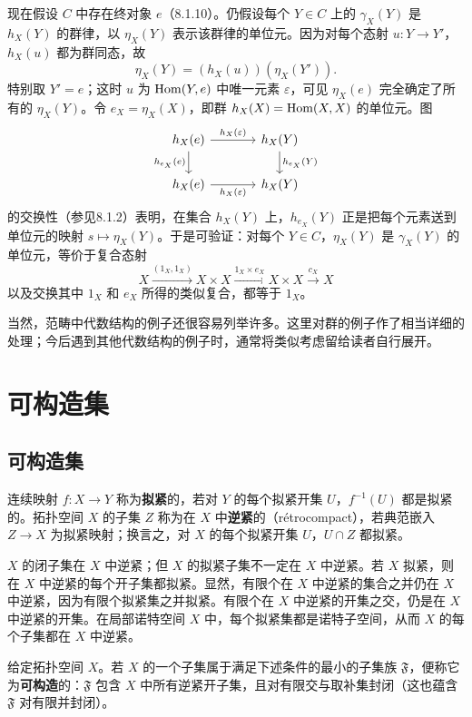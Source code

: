 现在假设 $C$ 中存在终对象 $e$（8.1.10）。仍假设每个 $Y\in C$ 上的 $\gamma_X(Y)$ 是 $h_X(Y)$ 的群律，以 $\eta_X(Y)$ 表示该群律的单位元。因为对每个态射 $u:Y\to Y'$，$h_X(u)$ 都为群同态，故
\[
\eta_X(Y)=(h_X(u))(\eta_X(Y')).
\]
特别取 $Y'=e$；这时 $u$ 为 $\operatorname{Hom}(Y,e)$ 中唯一元素 $\varepsilon$，可见 $\eta_X(e)$ 完全确定了所有的 $\eta_X(Y)$。令 $e_X=\eta_X(X)$，即群 $h_X(X)=\operatorname{Hom}(X,X)$ 的单位元。图
\[
\begin{tikzcd}[column sep=large]
h_X(e)\arrow[r,"h_X(\varepsilon)"]\arrow[d,"h_{e_X}(e)"']&h_X(Y)\arrow[d,"h_{e_X}(Y)"]\\
h_X(e)\arrow[r,"h_X(\varepsilon)"']&h_X(Y)
\end{tikzcd}
\]
的交换性（参见8.1.2）表明，在集合 $h_X(Y)$ 上，$h_{e_X}(Y)$ 正是把每个元素送到单位元的映射 $s\mapsto\eta_X(Y)$。于是可验证：对每个 $Y\in C$，$\eta_X(Y)$ 是 $\gamma_X(Y)$ 的单位元，等价于复合态射
\[
X\xrightarrow{(1_X,1_X)}X\times X
\xrightarrow{1_X\times e_X}X\times X\xrightarrow{c_X}X
\]
以及交换其中 $1_X$ 和 $e_X$ 所得的类似复合，都等于 $1_X$。

当然，范畴中代数结构的例子还很容易列举许多。这里对群的例子作了相当详细的处理；今后遇到其他代数结构的例子时，通常将类似考虑留给读者自行展开。\par

\section{可构造集}
\subsection{可构造集}
连续映射 $f:X\to Y$ 称为\textbf{拟紧}的，若对 $Y$ 的每个拟紧开集 $U$，$f^{-1}(U)$ 都是拟紧的。拓扑空间 $X$ 的子集 $Z$ 称为在 $X$ 中\textbf{逆紧}的（rétrocompact），若典范嵌入 $Z\to X$ 为拟紧映射；换言之，对 $X$ 的每个拟紧开集 $U$，$U\cap Z$ 都拟紧。

$X$ 的闭子集在 $X$ 中逆紧；但 $X$ 的拟紧子集不一定在 $X$ 中逆紧。若 $X$ 拟紧，则在 $X$ 中逆紧的每个开子集都拟紧。显然，有限个在 $X$ 中逆紧的集合之并仍在 $X$ 中逆紧，因为有限个拟紧集之并拟紧。有限个在 $X$ 中逆紧的开集之交，仍是在 $X$ 中逆紧的开集。在局部诺特空间 $X$ 中，每个拟紧集都是诺特子空间，从而 $X$ 的每个子集都在 $X$ 中逆紧。

给定拓扑空间 $X$。若 $X$ 的一个子集属于满足下述条件的最小的子集族 $\mathfrak F$，便称它为\textbf{可构造}的：$\mathfrak F$ 包含 $X$ 中所有逆紧开子集，且对有限交与取补集封闭（这也蕴含 $\mathfrak F$ 对有限并封闭）。

